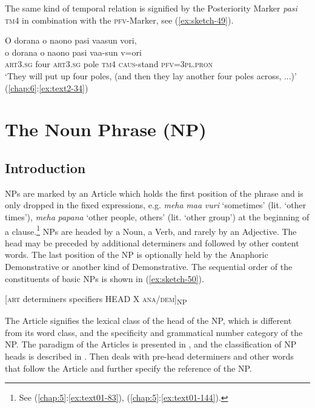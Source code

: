 \documentclass[output=paper]{langscibook}
\begin{document}
The same kind of temporal relation is signified by the Posteriority Marker \textit{pasi} \textsc{tm}4 in combination with the \textsc{pfv}-Marker, see (\ref{ex:sketch-49}).

\ea\label{ex:sketch-49}
    O dorana o naono pasi vaasun vori,\\
    \gll o	dorana	o	naono	pasi	vaa-sun	v=ori\\
    \textsc{art}3.\textsc{sg}	four	\textsc{art}3.\textsc{sg}	pole	\textsc{tm}4	\textsc{caus}-stand	\textsc{pfv}=3\textsc{pl}.\textsc{pron}\\
    \glt `They will put up four poles, (and then they lay another four poles across, ...)' (\ref{chap:6}:\ref{ex:text2-34})
\z

\section{The Noun Phrase (NP)}\label{sec:np}
\subsection{Introduction}\label{sec:npintro}

NPs are marked by an Article which holds the first position of the phrase and is only dropped in the fixed expressions, e.g. \textit{meha} \textit{maa} \textit{vuri} `sometimes' (lit. `other times'), \textit{meha} \textit{papana} `other people, others' (lit. `other group') at the beginning of a clause.\footnote{See (\ref{chap:5}:\ref{ex:text01-83}), (\ref{chap:5}:\ref{ex:text01-144}).} NPs are headed by a Noun, a Verb, and rarely by an Adjective. The head may be preceded by additional determiners and followed by other content words. The last position of the NP is optionally held by the Anaphoric Demonstrative or another kind of Demonstrative. The sequential order of the constituents of basic NPs is shown in (\ref{ex:sketch-50}).

\ea\label{ex:sketch-50}
    \textup{[\textsc{art} determiners specifiers HEAD X \textsc{ana}/\textsc{dem}]\textsubscript{NP}}
\z

The Article signifies the lexical class of the head of the NP, which is different from its word class, and the specificity and grammatical number category of the NP. The paradigm of the Articles is presented in , and the classification of NP heads is described in . Then  deals with pre-head determiners and other words that follow the Article and further specify the reference of the NP.
\end{document}
